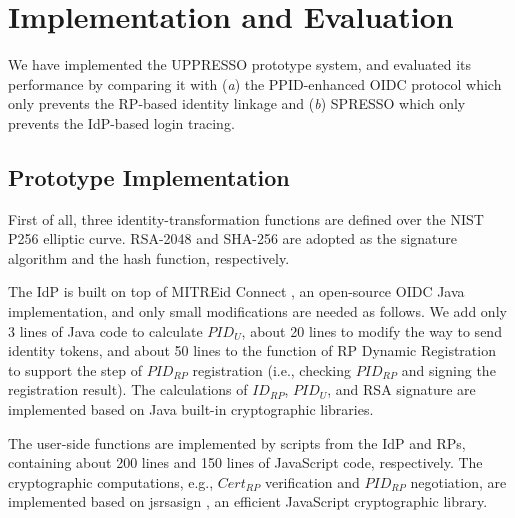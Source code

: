 \section{Implementation and Evaluation}
\label{sec:implementation}
We have implemented the UPPRESSO prototype system, and evaluated its performance
 by comparing it with (\emph{a}) the PPID-enhanced OIDC protocol \cite{MITREid}
    which only prevents the RP-based identity linkage
     and (\emph{b}) SPRESSO \cite{SPRESSO} which only prevents the IdP-based login tracing.

\subsection{Prototype Implementation}
First of all, three identity-transformation functions are defined over
        the NIST P256 elliptic curve.
RSA-2048 and SHA-256 are adopted as the signature algorithm and the hash function, respectively.

The IdP is built on top of MITREid Connect \cite{MITREid},
    an open-source OIDC Java implementation, %
    and only small modifications are needed as follows.
We add only 3 lines of Java code to calculate $PID_U$,
     about 20 lines to modify the way to send identity tokens,
    and about 50 lines to the function of RP Dynamic Registration to support the step of $PID_{RP}$ registration
            (i.e., checking $PID_{RP}$ and signing the registration result).
The calculations of $ID_{RP}$, $PID_U$, and RSA signature are implemented based on Java built-in cryptographic libraries. %

The user-side functions are implemented by scripts from the IdP and RPs,
     containing about 200 lines and 150 lines of JavaScript code, respectively.
The cryptographic computations, e.g., $Cert_{RP}$ verification and $PID_{RP}$ negotiation, are implemented based on jsrsasign \cite{jsrsasign}, an efficient JavaScript cryptographic library.


